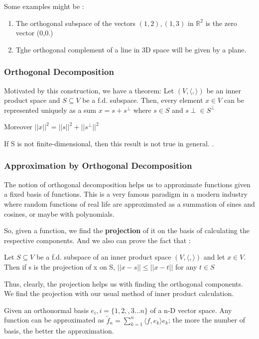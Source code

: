 Some examples might be :

\begin{enumerate}
    \item The orthogonal subspace of the vectors $(1,2), (1,3)$ in $\mathbb{R}^2$ is the zero vector (0,0.)
    \item Tghe orthogonal complement of a line in 3D space will be given by a plane.
\end{enumerate}

\subsubsection{Orthogonal Decomposition}

Motivated by this construction, we have a theorem: Let
$(V,\langle, \rangle)$ be an inner product space and $S \subseteq V$ be a f.d.
subspace. Then, every element $x \in V$ can be represented
uniquely as a sum $x = s + s^
\perp$ where $s \in S$ and $s
\perp ∈ S^
\perp$

Moreover $||x||^2 = ||s||^2 + ||s^\perp||^2$

If S is not finite-dimensional, then this result is not true in general.
.


\subsubsection{Approximation by Orthogonal Decomposition}

The notion of orthogonal decomposition helps us to approximate functions given a fixed basis of functions. This is a very famous paradigm in a modern industry where random functions of real life are approximated as a summation of sines and cosines, or maybe with polynomials. 

So, given a function, we find the \textbf{projection} of it on the basis of calculating the respective components. And we also can prove the fact that :

\begin{outline}
    Let $S \subseteq V$ be a f.d. subspace of an inner product space
$(V,\langle,\rangle)$ and let $x \in V$. Then if s is the projection of x on S,
$||x − s||\leq ||x − t||$ for any $t \in S$
\end{outline}

Thus, clearly, the projection helps us with finding the orthogonal components. We find the projection with our usual method of inner product calculation. 

Given an orthonormal basis $e_i, i=\{1, 2, ,3 ... n\}$ of a n-D vector space. Any function can be approximated as $\tilde{f}_n  = \sum_{k=1}^n \langle f, e_k \rangle e_k$; the more the number of basis, the better the approximation. 


